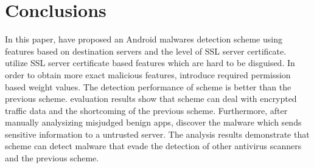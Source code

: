 \chapter{Conclusions}\label{sec:conclusion}
In this paper, \we have proposed an Android malwares detection scheme using features based on destination servers and the level of SSL server certificate.
\We utilize SSL server certificate based features which are hard to be disguised.
In order to obtain more exact malicious features, \we introduce required permission based weight values.
The detection performance of \our scheme is better than the previous scheme.
\Our evaluation results show that \our scheme can deal with encrypted traffic data and the shortcoming of the previous scheme.
Furthermore, after manually analysizing misjudged benign apps, \we discover the malware which sends sensitive information to a untrusted server.
The analysis results demonstrate that \our scheme can detect malware that evade the detection of other antivirus scanners and the previous scheme.

